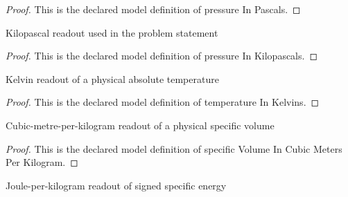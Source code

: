 \begin{proof}
  This is the declared model definition of pressure In Pascals.
\end{proof}
\begin{definition}
  \label{def:physics:phyx-mini-0459:phyxminiproblems-problemphyxmini0459-pressureinkilopascals}
  Kilopascal readout used in the problem statement
\end{definition}
\begin{proof}
  This is the declared model definition of pressure In Kilopascals.
\end{proof}
\begin{definition}
  \label{def:physics:phyx-mini-0459:phyxminiproblems-problemphyxmini0459-temperatureinkelvins}
  Kelvin readout of a physical absolute temperature
\end{definition}
\begin{proof}
  This is the declared model definition of temperature In Kelvins.
\end{proof}
\begin{definition}
  \label{def:physics:phyx-mini-0459:phyxminiproblems-problemphyxmini0459-specificvolumeincubicmetersperkilogram}
  Cubic-metre-per-kilogram readout of a physical specific volume
\end{definition}
\begin{proof}
  This is the declared model definition of specific Volume In Cubic Meters Per Kilogram.
\end{proof}
\begin{definition}
  \label{def:physics:phyx-mini-0459:phyxminiproblems-problemphyxmini0459-specificenergyinjoulesperkilogram}
  Joule-per-kilogram readout of signed specific energy
\end{definition}
